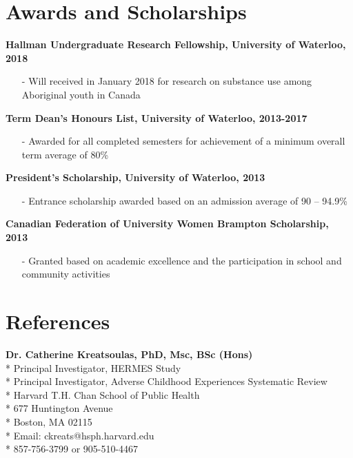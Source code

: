 \documentclass[11pt,a4paper,sans]{moderncv2}        %
\begin{document}
{{{{{{{{{{{{{{{\section{Awards and Scholarships}
\textbf{Hallman Undergraduate Research Fellowship, University of Waterloo, 2018} 
\begin{itemize}
\item[-] Will received in January 2018 for research on substance use among Aboriginal youth in Canada 
\end{itemize}
{\vspace{8pt}
\textbf{Term Dean's Honours List, University of Waterloo, 2013-2017} 
\begin{itemize}
\item[-] Awarded for all completed semesters for achievement of a minimum overall term average of 80\%
\end{itemize}
{\vspace{8pt}
\textbf{President's Scholarship, University of Waterloo, 2013}
\begin{itemize}
\item[-] Entrance scholarship awarded based on an admission average of 90 – 94.9\% 
\end{itemize}
{\vspace{8pt}
\textbf{Canadian Federation of University Women Brampton Scholarship, 2013} 
\begin{itemize}
\item[-] Granted based on academic excellence and the participation in school and community activities
\end{itemize}


\newpage
\makecvtitle
\vspace*{-7mm}
\section{References}
\vspace{5pt}

\large
\textbf{Dr. Catherine Kreatsoulas, PhD, Msc, BSc (Hons)} \\*
Principal Investigator, HERMES Study \\*
Principal Investigator, Adverse Childhood Experiences Systematic Review \\*
Harvard T.H. Chan School of Public Health \\*
677 Huntington Avenue \\*
Boston, MA 02115 \\*
Email: ckreats@hsph.harvard.edu \\*
857-756-3799 or 905-510-4467\\
\vspace{10pt}

}}}}}}}}}}}}}}}}}}
\end{document}
